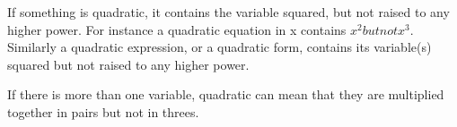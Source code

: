 If something is quadratic, it contains the variable squared, but not
raised to any higher power. For instance a
quadratic equation in x contains $x^{2} but not x^{3}.$  Similarly a quadratic expression,
or a quadratic form, contains its variable(s) squared but not raised to any higher power.
\par
 If there is more than
one variable, quadratic can mean that they are multiplied together
in pairs but not in threes.